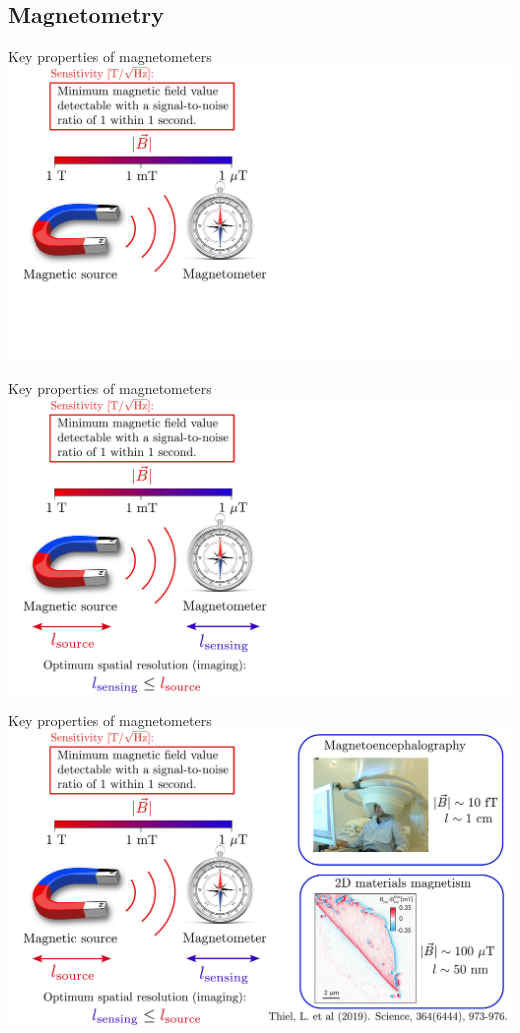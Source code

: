 \documentclass{beamer}
\begin{document}
\subsection{Magnetometry}
\begin{frame}{Key properties of magnetometers}
\centering
\includegraphics[width=\textwidth,height=0.85\textheight,keepaspectratio]{Slide_magnetometer_size_f-2}
\end{frame}

\begin{frame}{Key properties of magnetometers}
\centering
\includegraphics[width=\textwidth,height=0.85\textheight,keepaspectratio]{Slide_magnetometer_size_f-1}
\end{frame}

\begin{frame}{Key properties of magnetometers}
\centering
\includegraphics[width=\textwidth,height=0.85\textheight,keepaspectratio]{Slide_magnetometer_size_f}
\end{frame}
\end{document}
